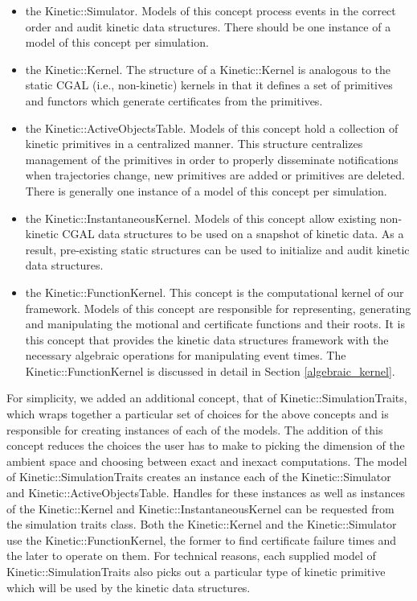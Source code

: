 \begin{itemize}

\item the Kinetic::Simulator. Models of this concept process events in
  the correct order and audit kinetic data structures. There should be
  one instance of a model of this concept per simulation.
\item the Kinetic::Kernel. The structure of a
  Kinetic::Kernel is analogous to the static CGAL (i.e.,
  non-kinetic) kernels in that it defines a set of primitives and
  functors which generate certificates from the primitives.
\item the Kinetic::ActiveObjectsTable. Models of this concept hold a
  collection of kinetic primitives in a centralized manner. This
  structure centralizes management of the primitives in order to
  properly disseminate notifications when trajectories change, new
  primitives are added or primitives are deleted.
  There is generally one instance of a model of this concept per simulation.
\item the Kinetic::InstantaneousKernel. Models of this concept allow
  existing non-kinetic CGAL data structures to be used on a snapshot
  of kinetic data. As a result, pre-existing static structures can be
  used to initialize and audit kinetic data structures.
\item the Kinetic::FunctionKernel. This concept is the computational
  kernel of our framework.  Models of this concept are responsible for
  representing, generating and manipulating the motional and
  certificate functions and their roots. It is this concept that
  provides the kinetic data structures framework with the necessary
  algebraic operations for manipulating event times. The
  Kinetic::FunctionKernel is discussed in detail in Section
  \ref{algebraic_kernel}.
\end{itemize}

For simplicity, we added an additional concept, that of
Kinetic::SimulationTraits, which wraps together a particular set of
choices for the above concepts and is responsible for creating
instances of each of the models. The addition of this concept reduces
the choices the user has to make to picking the dimension of the
ambient space and choosing between exact and inexact computations. The
model of Kinetic::SimulationTraits creates an instance each of the
Kinetic::Simulator and Kinetic::ActiveObjectsTable. Handles for
these instances as well as instances of the Kinetic::Kernel
and Kinetic::InstantaneousKernel can be requested from the simulation
traits class. Both the Kinetic::Kernel and the
Kinetic::Simulator use the Kinetic::FunctionKernel, the former to find
certificate failure times and the later to operate on them. For
technical reasons, each supplied model of Kinetic::SimulationTraits also
picks out a particular type of kinetic primitive which will be used by
the kinetic data structures.


